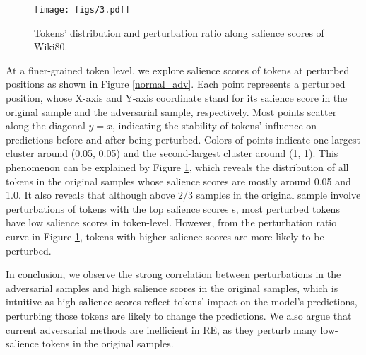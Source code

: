 \documentclass[sigconf]{acmart}
\begin{document}
\begin{figure}[h] \centering
  \texttt{[image: figs/3.pdf]}
\caption{Tokens' distribution and perturbation ratio along salience scores of Wiki80.}
\label{token_dist}
\end{figure}
At a finer-grained token level, we explore salience scores of tokens at perturbed positions as shown in Figure \ref{normal_adv}. 
Each point represents a perturbed position, whose X-axis and Y-axis coordinate stand for its salience score in the original sample and the adversarial sample, respectively. Most points scatter along the diagonal $y=x$, indicating the stability of tokens' influence on predictions before and after being perturbed.
Colors of points indicate one largest cluster around (0.05, 0.05) and the second-largest cluster around (1, 1).
This phenomenon can be explained by Figure \ref{token_dist}, which reveals the distribution of all tokens in the original samples whose salience scores are mostly around 0.05 and 1.0.
It also reveals that although above 2/3 samples in the original sample involve perturbations of tokens with the top salience scores s, most perturbed tokens have low salience scores in token-level. However, from the perturbation ratio curve in Figure \ref{token_dist},  tokens with higher salience scores are more likely to be perturbed.

In conclusion, we observe the strong correlation between perturbations in the adversarial samples and high salience scores in the original samples, which is intuitive as high salience scores reflect tokens' impact on the model's predictions, perturbing those tokens are likely to change the predictions. We also argue that current adversarial methods are inefficient in RE, as they perturb many low-salience tokens in the original samples.
\end{document}
